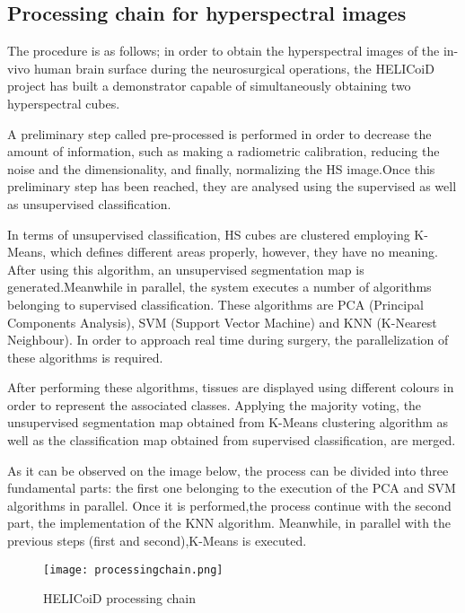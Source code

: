     \subsection{Processing chain for hyperspectral images}
            
The procedure is as follows; in order to obtain the hyperspectral images of the in- vivo human brain surface during the neurosurgical operations, the HELICoiD project has built a demonstrator capable of simultaneously obtaining two hyperspectral cubes.  

	 A preliminary step called pre-processed is performed in order to decrease the amount of information, such as making a radiometric calibration, reducing the noise and the dimensionality, and finally, normalizing the HS image.Once this preliminary step has been reached, they are analysed using the supervised as well as unsupervised classification.

	In terms of unsupervised classification, HS cubes are clustered employing K-Means, which defines different areas properly, however, they have no meaning. After using this algorithm, an unsupervised segmentation map is generated.Meanwhile in parallel, the system executes a number of algorithms belonging to supervised classification. These algorithms are PCA (Principal Components Analysis), SVM (Support Vector Machine) and KNN (K-Nearest Neighbour). In order to approach real time during surgery, the parallelization of these algorithms is required.

   After performing these algorithms, tissues are displayed using different colours in order to represent the associated classes. 
Applying the majority voting, the unsupervised segmentation map obtained from K-Means clustering algorithm as well as the classification map obtained from supervised classification, are merged. 

	As it can be observed on the image below, the process can be divided into three fundamental parts: the first one belonging to the execution of the PCA and SVM algorithms in parallel. Once it is performed,the process continue with the second part, the implementation of the KNN algorithm. Meanwhile, in parallel with the previous steps (first and second),K-Means is executed.

	  \begin{figure}[H]
        \texttt{[image: processingchain.png]} 
        \caption{HELICoiD processing chain}       
        \centering    
        \label{fig:systemArch}
    \end{figure}
	
